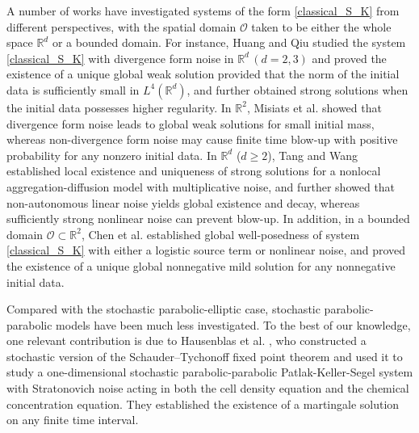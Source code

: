 \documentclass[reqno, 11pt]{amsart}
\theoremstyle{definition}
\numberwithin{equation}{section} \numberwithin{lem}{section}
\numberwithin{thm}{section} \numberwithin{prop}{section}
\numberwithin{cor}{section} \numberwithin{rem}{section}
\numberwithin{defn}{section}
\begin{document}
A number of works have investigated systems of the form \eqref{classical_S_K} from different perspectives, with the spatial domain \(\mathcal{O}\) taken to be either the whole space \(\mathbb{R}^d\) or a bounded domain. For instance, 
 Huang and Qiu \cite{huang2021microscopic} studied the  system \eqref{classical_S_K} with divergence form noise in $\mathbb{R}^d\,(d=2,3)$  and proved the existence of a unique global weak solution provided that the norm of the initial data is sufficiently small in ${L^4(\mathbb{R}^d)}$, and further obtained strong solutions when the initial data possesses higher regularity. In $\mathbb{R}^2$, Misiats et al. \cite{misiats2022global}  showed that divergence form noise leads to global weak solutions for small initial mass, whereas non-divergence form noise may cause finite time blow-up with positive probability for any nonzero initial data. 
 In $\mathbb R^d$ ($d\ge2$), Tang and Wang \cite{tang2024strong} established local existence and uniqueness of strong solutions for a nonlocal aggregation-diffusion model   with multiplicative noise, and further showed that non-autonomous linear noise yields global existence and decay, whereas sufficiently strong nonlinear noise can prevent blow-up. In addition, in a bounded domain $\mathcal{O}\subset \mathbb{R}^2$,  Chen et al. \cite{chen2025well} established global well-posedness of  system \eqref{classical_S_K} with either a logistic source term or nonlinear noise, and proved the existence of a unique global nonnegative mild solution for any nonnegative initial data. 
 
 Compared with the stochastic parabolic-elliptic case,  stochastic parabolic-parabolic models have been much less investigated. To the best of our knowledge, one relevant contribution is due to Hausenblas et al. \cite{hausenblas2022one}, who constructed a stochastic version of the Schauder–Tychonoff fixed point theorem  and used it to study  a one-dimensional stochastic parabolic-parabolic Patlak-Keller-Segel system with Stratonovich noise acting in both the cell density equation and the chemical concentration equation. They established the existence of a martingale solution on any finite time interval.
\end{document}
